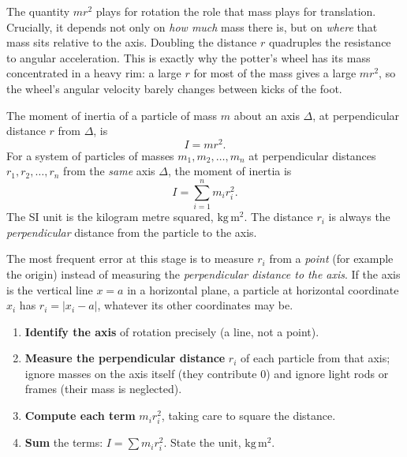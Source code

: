 \documentclass[11pt]{article}
\newcommand{\cle}[1]{{\popxbold\color{popdark}#1}}
\newcounter{popsec}
\newcounter{popsub}
\newcommand{\courssub}[1]{%
  \stepcounter{popsub}%
  \par\vspace{9pt}\noindent{\popxbold\fontsize{11.5}{13}\selectfont\color{popink}{\color{poporange}\thepopsec.\thepopsub}\hspace{6pt}#1}\par\nopagebreak\vspace{4pt}
}
\begin{document}
The quantity $mr^2$ plays for rotation the role that mass plays for translation. Crucially, it depends not only on \emph{how much} mass there is, but on \emph{where} that mass sits relative to the axis. Doubling the distance $r$ quadruples the resistance to angular acceleration. This is exactly why the potter's wheel has its mass concentrated in a heavy rim: a large $r$ for most of the mass gives a large $mr^2$, so the wheel's angular velocity barely changes between kicks of the foot.

\begin{definition}
The \cle{moment of inertia} of a particle of mass $m$ about an axis $\Delta$, at perpendicular distance $r$ from $\Delta$, is
\[
I = mr^2.
\]
For a system of particles of masses $m_1, m_2, \dots, m_n$ at perpendicular distances $r_1, r_2, \dots, r_n$ from the \emph{same} axis $\Delta$, the moment of inertia is
\[
I = \sum_{i=1}^{n} m_i r_i^2.
\]
The SI unit is the kilogram metre squared, $\mathrm{kg\,m^2}$. The distance $r_i$ is always the \emph{perpendicular} distance from the particle to the axis.
\end{definition}

\begin{attention}
The most frequent error at this stage is to measure $r_i$ from a \emph{point} (for example the origin) instead of measuring the \emph{perpendicular distance to the axis}. If the axis is the vertical line $x = a$ in a horizontal plane, a particle at horizontal coordinate $x_i$ has $r_i = |x_i - a|$, whatever its other coordinates may be.
\end{attention}

\courssub{Computing $I$ for Discrete Systems}

\begin{methode}
\begin{enumerate}
\item \textbf{Identify the axis} of rotation precisely (a line, not a point).
\item \textbf{Measure the perpendicular distance} $r_i$ of each particle from that axis; ignore masses on the axis itself (they contribute $0$) and ignore light rods or frames (their mass is neglected).
\item \textbf{Compute each term} $m_i r_i^2$, taking care to square the distance.
\item \textbf{Sum} the terms: $I = \sum m_i r_i^2$. State the unit, $\mathrm{kg\,m^2}$.
\end{enumerate}
\end{methode}
\end{document}
